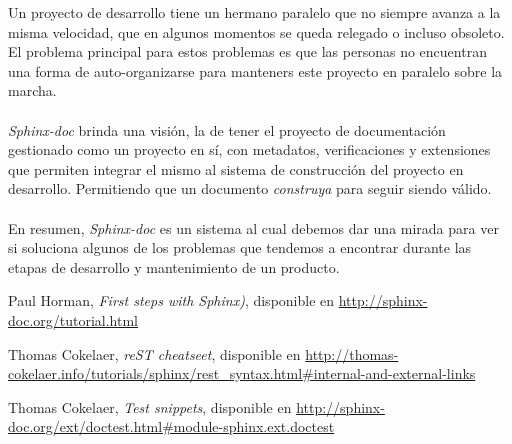 \documentclass{sig-alternate}
\begin{document}
	Un proyecto de desarrollo tiene un hermano paralelo que no siempre
	avanza a la misma velocidad, que en algunos momentos se queda relegado
	o incluso obsoleto. El problema principal para estos problemas es que 
	las personas no encuentran una forma de auto-organizarse para 
	manteners este proyecto en paralelo sobre la marcha.
	\\ \\
	\emph{Sphinx-doc} brinda una visi\'on, la de tener el proyecto de documentaci\'on 
	gestionado como un proyecto en s\'i, con metadatos, verificaciones y 
	extensiones que permiten integrar el mismo al sistema de construcci\'on 
	del proyecto en desarrollo. Permitiendo que un documento \emph{construya}
	para seguir siendo v\'alido.
	\\ \\
	En resumen, \emph{Sphinx-doc} es un sistema al cual debemos dar una mirada para ver 
	si soluciona algunos de los problemas que tendemos a encontrar durante las 
	etapas de desarrollo y mantenimiento de un producto.


\begin{thebibliography}{9}

 Paul Horman, \emph{First steps with Sphinx)}, 
disponible en 
\url{http://sphinx-doc.org/tutorial.html}

 Thomas Cokelaer, \emph{reST cheatseet}, 
disponible en 
\url{http://thomas-cokelaer.info/tutorials/sphinx/rest_syntax.html#internal-and-external-links}

 Thomas Cokelaer, \emph{Test snippets}, 
disponible en 
\url{http://sphinx-doc.org/ext/doctest.html#module-sphinx.ext.doctest}


\end{thebibliography}
\end{document}
